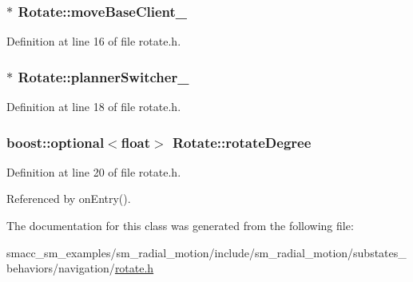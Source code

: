 \subsubsection[{\texorpdfstring{move\+Base\+Client\+\_\+}{moveBaseClient_}}]{$\ast$ Rotate\+::move\+Base\+Client\+\_\+}\hypertarget{classRotate_ae632332fc9901b146697d5942d83ed42}{}\label{classRotate_ae632332fc9901b146697d5942d83ed42}


Definition at line 16 of file rotate.\+h.

\subsubsection[{\texorpdfstring{planner\+Switcher\+\_\+}{plannerSwitcher_}}]{$\ast$ Rotate\+::planner\+Switcher\+\_\+}\hypertarget{classRotate_a83b5665eb3ccd4f4a1e38976bc6fec6e}{}\label{classRotate_a83b5665eb3ccd4f4a1e38976bc6fec6e}


Definition at line 18 of file rotate.\+h.

\subsubsection[{\texorpdfstring{rotate\+Degree}{rotateDegree}}]{\setlength{\rightskip}{0pt plus 5cm}boost\+::optional$<$float$>$ Rotate\+::rotate\+Degree}\hypertarget{classRotate_a0d494e54d8311aafe97bd44b381c039c}{}\label{classRotate_a0d494e54d8311aafe97bd44b381c039c}


Definition at line 20 of file rotate.\+h.



Referenced by on\+Entry().



The documentation for this class was generated from the following file\+:\begin{DoxyCompactItemize}
\item 
smacc\+\_\+sm\+\_\+examples/sm\+\_\+radial\+\_\+motion/include/sm\+\_\+radial\+\_\+motion/substates\+\_\+behaviors/navigation/\hyperlink{rotate_8h}{rotate.\+h}\end{DoxyCompactItemize}
